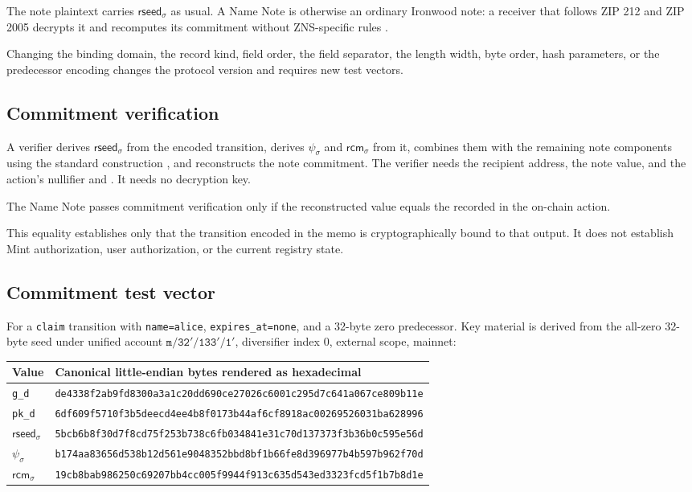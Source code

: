 The note plaintext carries $\mathsf{rseed}_\sigma$ as usual. A Name Note is otherwise an ordinary Ironwood note: a receiver that follows ZIP 212 and ZIP 2005 decrypts it and recomputes its commitment without ZNS-specific rules \cite{zip212,zip2005}.

Changing the binding domain, the record kind, field order, the field separator, the length width, byte order, hash parameters, or the predecessor encoding changes the protocol version and requires new test vectors.

\subsection{Commitment verification}

A verifier derives $\mathsf{rseed}_\sigma$ from the encoded transition, derives $\psi_\sigma$ and $\mathsf{rcm}_\sigma$ from it, combines them with the remaining note components using the standard construction \cite{zcash-protocol,zip224}, and reconstructs the note commitment. The verifier needs the recipient address, the note value, and the action's nullifier and . It needs no decryption key.

The Name Note passes commitment verification only if the reconstructed value equals the  recorded in the on-chain action.

This equality establishes only that the transition encoded in the memo is cryptographically bound to that output. It does not establish Mint authorization, user authorization, or the current registry state.

\subsection{Commitment test vector}

For a \texttt{claim} transition with \texttt{name=alice}, \texttt{expires\_at=none}, and a 32-byte zero predecessor. Key material is derived from the all-zero 32-byte seed under unified account $\mathtt{m/32'/133'/1'}$, diversifier index 0, external scope, mainnet:

{\footnotesize
\begin{center}
\begin{tabularx}{\textwidth}{@{}lY@{}}
\toprule
Value & Canonical little-endian bytes rendered as hexadecimal \\
\midrule
\texttt{g\_d} & \texttt{de4338f2ab9fd8300a3a1c20dd690ce27026c6001c295d7c641a067ce809b11e} \\
\texttt{pk\_d} & \texttt{6df609f5710f3b5deecd4ee4b8f0173b44af6cf8918ac00269526031ba628996} \\
$\mathsf{rseed}_\sigma$ & \texttt{5bcb6b8f30d7f8cd75f253b738c6fb034841e31c70d137373f3b36b0c595e56d} \\
$\psi_\sigma$ & \texttt{b174aa83656d538b12d561e9048352bbd8bf1b66fe8d396977b4b597b962f70d} \\
$\mathsf{rcm}_\sigma$ & \texttt{19cb8bab986250c69207bb4cc005f9944f913c635d543ed3323fcd5f1b7b8d1e} \\
\bottomrule
\end{tabularx}
\end{center}
}

